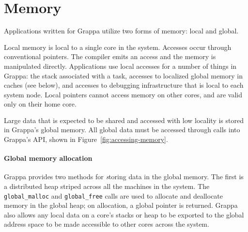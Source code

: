 \section{Memory}


Applications written for Grappa utilize two forms of memory: local and
global.

Local memory is local to a single core in the system.  Accesses occur
through conventional pointers.  The compiler emits an access and the
memory is manipulated directly.  Applications use local accesses for a
number of things in Grappa: the stack associated with a task, accesses
to localized global memory in caches (see below), and accesses to
debugging infrastructure that is local to each system node.  Local
pointers cannot access memory on other cores, and are valid only on
their home core.

Large data that is expected to be shared and accessed with low locality is
stored in Grappa's global memory. All global data must be accessed through
calls into Grappa's API, shown in Figure~\ref{fig:accessing-memory}.

\paragraph{Global memory allocation}
Grappa provides two methods for {\emph storing} data in the global memory. The
first is a distributed heap striped across all the machines in the
system. The \texttt{global\_malloc} and \texttt{global\_free} calls
are used to allocate and deallocate memory in the global heap; on
allocation, a global pointer is returned. Grappa also allows any local
data on a core's stacks or heap to be exported to the global address
space to be made accessible to other cores across the system.


